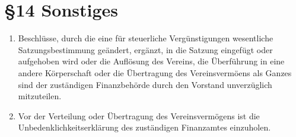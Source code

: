 \section*{§14 Sonstiges}
\begin{enumerate}
\item Beschlüsse, durch die eine für steuerliche Vergünstigungen wesentliche
Satzungsbestimmung geändert, ergänzt, in die Satzung eingefügt oder
aufgehoben wird oder die Auflösung des Vereins, die Überführung in
eine andere Körperschaft oder die Übertragung des Vereinsvermöens
als Ganzes sind der zuständigen Finanzbehörde durch den Vorstand unverzüglich
mitzuteilen.
\item Vor der Verteilung oder Übertragung des Vereinsvermögens ist die Unbedenklichkeitserklärung
des zuständigen Finanzamtes einzuholen.
\end{enumerate}
